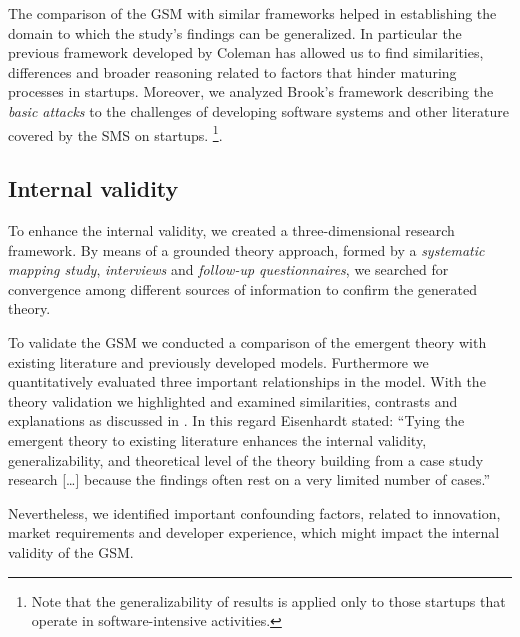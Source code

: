 \documentclass[10pt,journal,letterpaper,compsoc]{IEEEtran}
\begin{document}
The comparison of the GSM with similar frameworks helped in establishing the
domain to which the study's findings can be generalized. In particular the
previous framework developed by Coleman \cite{Coleman2008} has allowed  us to
find similarities, differences and broader reasoning related to  factors that
hinder maturing processes in startups. Moreover, we analyzed  Brook's framework
describing the \textit{basic attacks} to the challenges of  developing software
systems and other literature covered by the SMS on startups.
\cite{SMS}\footnote{Note that the generalizability of results is applied only to
those startups that operate in software-intensive activities.}.  

\subsection{Internal validity} %
To enhance the internal validity, we created a three-dimensional research  
framework. By means of a grounded theory approach, formed by a  
\textit{systematic mapping study}, \textit{interviews}
and \textit{follow-up  questionnaires}, we searched for convergence among
different sources of  information to confirm the generated theory.

To validate the GSM we conducted a comparison of the emergent theory with
existing literature and previously developed models. Furthermore we
quantitatively evaluated three important relationships in the model. With the
theory validation we highlighted and examined similarities, contrasts and
explanations as discussed in \cite{Eisenhardt2007}. In this regard Eisenhardt
stated: ``Tying the emergent theory to existing literature enhances the internal
validity, generalizability, and theoretical level of the theory building from  a
case study research [\ldots] because the findings often rest on a very limited
number of cases.''

Nevertheless, we identified important confounding factors, related to
innovation, market requirements and developer experience, which might impact
the internal validity of the GSM.
\end{document}
